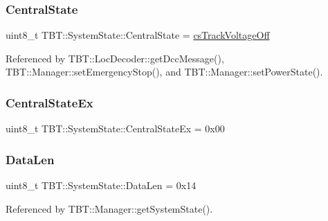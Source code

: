 \subsubsection{\texorpdfstring{Central\+State}{CentralState}}
{\footnotesize\ttfamily uint8\+\_\+t T\+B\+T\+::\+System\+State\+::\+Central\+State = \hyperlink{Types_8h_a2b9d2f770953d435f6232ff515818db2_a2b9d2f770953d435f6232ff515818db2}{cs\+Track\+Voltage\+Off}}



Referenced by T\+B\+T\+::\+Loc\+Decoder\+::get\+Dcc\+Message(), T\+B\+T\+::\+Manager\+::set\+Emergency\+Stop(), and T\+B\+T\+::\+Manager\+::set\+Power\+State().

\mbox{\label{structTBT_1_1SystemState_a582d67531b086360e8fdd068cf6b2de2_a582d67531b086360e8fdd068cf6b2de2}} 
\subsubsection{\texorpdfstring{Central\+State\+Ex}{CentralStateEx}}
{\footnotesize\ttfamily uint8\+\_\+t T\+B\+T\+::\+System\+State\+::\+Central\+State\+Ex = 0x00}

\mbox{\label{structTBT_1_1SystemState_a17d517bed6954e31982eca5685b36d04_a17d517bed6954e31982eca5685b36d04}} 
\subsubsection{\texorpdfstring{Data\+Len}{DataLen}}
{\footnotesize\ttfamily uint8\+\_\+t T\+B\+T\+::\+System\+State\+::\+Data\+Len = 0x14}



Referenced by T\+B\+T\+::\+Manager\+::get\+System\+State().

\mbox{\label{structTBT_1_1SystemState_a27329736b0b53fc4239397b4e9a0194c_a27329736b0b53fc4239397b4e9a0194c}} 
